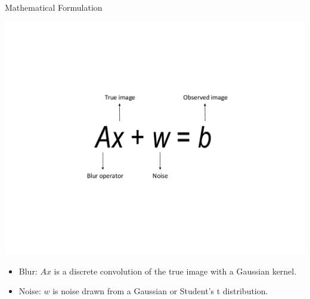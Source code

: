 \documentclass[12pt]{beamer}
\begin{document}
\begin{frame}{Mathematical Formulation}
\begin{center}
\vspace{-3ex}
\includegraphics[scale=0.5]{../figures/linearModel}
\end{center}

\vspace{-3ex}
\begin{itemize}
\item Blur: $Ax$ is a discrete convolution of the true image with a Gaussian kernel.
\item Noise: $w$ is noise drawn from a Gaussian or Student's t distribution. 
\end{itemize}
\end{frame}
\end{document}
